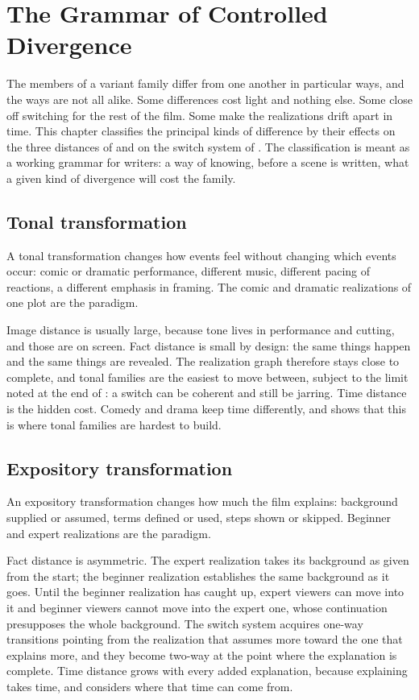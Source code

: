 \chapter{The Grammar of Controlled Divergence}\label{ch:divergence}

The members of a variant family differ from one another in particular ways, and the ways are not all alike. Some differences cost light and nothing else. Some close off switching for the rest of the film. Some make the realizations drift apart in time. This chapter classifies the principal kinds of difference by their effects on the three distances of  and on the switch system of . The classification is meant as a working grammar for writers: a way of knowing, before a scene is written, what a given kind of divergence will cost the family.

\section{Tonal transformation}

A tonal transformation changes how events feel without changing which events occur: comic or dramatic performance, different music, different pacing of reactions, a different emphasis in framing. The comic and dramatic realizations of one plot are the paradigm.

Image distance is usually large, because tone lives in performance and cutting, and those are on screen. Fact distance is small by design: the same things happen and the same things are revealed. The realization graph therefore stays close to complete, and tonal families are the easiest to move between, subject to the limit noted at the end of : a switch can be coherent and still be jarring. Time distance is the hidden cost. Comedy and drama keep time differently, and  shows that this is where tonal families are hardest to build.

\section{Expository transformation}

An expository transformation changes how much the film explains: background supplied or assumed, terms defined or used, steps shown or skipped. Beginner and expert realizations are the paradigm.

Fact distance is asymmetric. The expert realization takes its background as given from the start; the beginner realization establishes the same background as it goes. Until the beginner realization has caught up, expert viewers can move into it and beginner viewers cannot move into the expert one, whose continuation presupposes the whole background. The switch system acquires one-way transitions pointing from the realization that assumes more toward the one that explains more, and they become two-way at the point where the explanation is complete. Time distance grows with every added explanation, because explaining takes time, and  considers where that time can come from.

